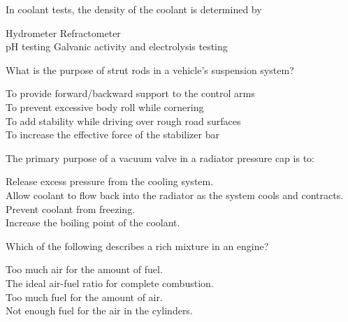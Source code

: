\documentclass[12pt]{exam}
\begin{document}
\begin{questions}
				\question In coolant tests, the density of the coolant is determined by \\
				\begin{oneparchoices}					
						\choice Hydrometer
						\choice Refractometer \\
						\choice pH testing
						\choice Galvanic activity and electrolysis testing
				\end{oneparchoices}
							
				\question What is the purpose of strut rods in a vehicle’s suspension system? \\
				 \begin{oneparchoices} 
					\choice To provide forward/backward support to the control arms \\
					\choice To prevent excessive body roll while cornering \\
					\choice To add stability while driving over rough road surfaces \\
					\choice To increase the effective force of the stabilizer bar
				\end{oneparchoices}
                \question The primary purpose of a vacuum valve in a radiator pressure cap is to: \\ %
                \begin{oneparchoices}
                    \choice Release excess pressure from the cooling system.\\
                    \choice Allow coolant to flow back into the radiator as the system cools and contracts. \\ %
                    \choice Prevent coolant from freezing. \\
                    \choice Increase the boiling point of the coolant.
                \end{oneparchoices}
                
                \question Which of the following describes a rich mixture in an engine? \\ %
                \begin{oneparchoices}
                    \choice Too much air for the amount of fuel. \\
                    \choice The ideal air-fuel ratio for complete combustion. \\
                    \choice Too much fuel for the amount of air. \\ %
                    \choice Not enough fuel for the air in the cylinders.
                \end{oneparchoices}


\end{questions}
\end{document}
